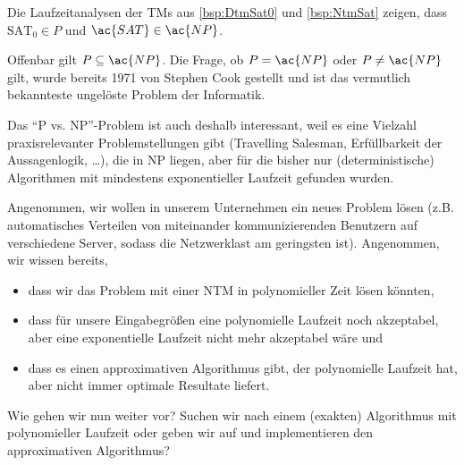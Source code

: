 \begin{Bemerkung}
 Die Laufzeitanalysen der \ac{TM}s aus \autoref{bsp:DtmSat0} und \autoref{bsp:NtmSat} zeigen, dass $\text{SAT}_0\in P$ und $\ac{SAT}\in \ac{NP}$.
\end{Bemerkung}


Offenbar gilt $P\subseteq \ac{NP}$.
Die Frage, ob $P=\ac{NP}$ oder $P\neq \ac{NP}$ gilt, wurde bereits 1971 von Stephen Cook gestellt und ist das vermutlich bekannteste ungelöste Problem der Informatik.

Das "`\ac{P} vs. \ac{NP}"'-Problem ist auch deshalb interessant, weil es eine Vielzahl praxisrelevanter Problemstellungen gibt (Travelling Salesman, Erfüllbarkeit der Aussagenlogik, \dots),
die in \ac{NP} liegen, aber für die bisher nur (deterministische) Algorithmen mit mindestens exponentieller Laufzeit gefunden wurden.

Angenommen, wir wollen in unserem Unternehmen ein neues Problem lösen
(z.B. automatisches Verteilen von miteinander kommunizierenden Benutzern auf verschiedene Server, sodass die Netzwerklast am geringsten ist).
Angenommen, wir wissen bereits,
\begin{itemize}
 \item dass wir das Problem mit einer \ac{NTM} in polynomieller Zeit lösen könnten,
 \item dass für unsere Eingabegrößen eine polynomielle Laufzeit noch akzeptabel, aber eine exponentielle Laufzeit nicht mehr akzeptabel wäre und
 \item dass es einen approximativen Algorithmus gibt, der polynomielle Laufzeit hat, aber nicht immer optimale Resultate liefert.
\end{itemize}
Wie gehen wir nun weiter vor? Suchen wir nach einem (exakten) Algorithmus mit polynomieller Laufzeit oder geben wir auf und implementieren den approximativen Algorithmus?

